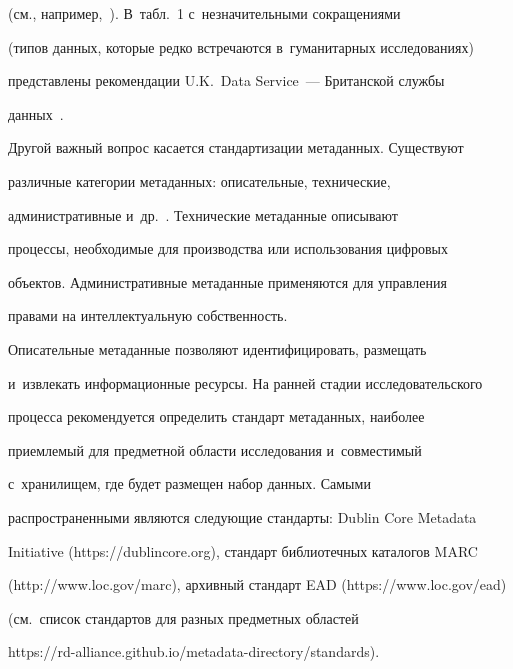 (см., например,~\cite{15-nur, 16-nur}). В~табл.~1 с~незначительными сокращениями 

(типов данных, которые редко встречаются в~гуманитарных исследованиях) 

представлены рекомендации U.K.\ Data Service~--- Британской службы 

данных~\cite{16-nur}.

  

  



  

  Другой важный вопрос касается стандартизации метаданных. Существуют 

различные категории метаданных: описательные, технические, 

административные и~др.~\cite{18-nur}. Технические метаданные описывают 

процессы, необходимые для производства или использования цифровых 

объектов. Административные метаданные применяются для управления 

правами на интеллектуальную собственность.

  

  Описательные метаданные позволяют идентифицировать, размещать 

и~извлекать информационные ресурсы. На ранней стадии исследовательского 

процесса рекомендуется определить стандарт метаданных, наиболее 

приемлемый для предметной области исследования и~совместимый 

с~хранилищем, где будет размещен набор данных. Самыми 

распространенными являются следующие стандарты: Dublin Core Metadata 

Initiative ({\sf https://dublincore.org}), стандарт библиотечных каталогов MARC 

({\sf http://www.loc.gov/marc}), архивный стандарт EAD ({\sf https://www.loc.gov/ead}) 

(см.\ список стандартов для разных предметных областей 

  {\sf https://rd-alliance.github.io/metadata-directory/standards}).

  

